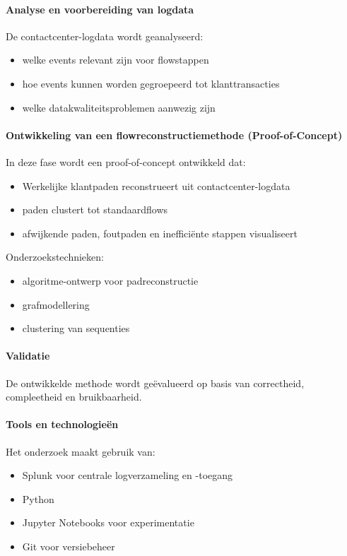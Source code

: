 \paragraph{Analyse en voorbereiding van logdata}
De contactcenter-logdata wordt geanalyseerd:
\begin{itemize}
  \item welke events relevant zijn voor flowstappen
  \item hoe events kunnen worden gegroepeerd tot klanttransacties
  \item welke datakwaliteitsproblemen aanwezig zijn
\end{itemize}




\paragraph{Ontwikkeling van een flowreconstructiemethode (Proof-of-Concept)}
In deze fase wordt een proof-of-concept ontwikkeld dat:
\begin{itemize}
  \item Werkelijke klantpaden reconstrueert uit contactcenter-logdata
  \item paden clustert tot standaardflows
  \item afwijkende paden, foutpaden en inefficiënte stappen visualiseert
\end{itemize}
Onderzoekstechnieken:
\begin{itemize}
  \item algoritme-ontwerp voor padreconstructie
  \item grafmodellering
  \item clustering van sequenties
\end{itemize}

\paragraph{Validatie}
De ontwikkelde methode wordt geëvalueerd op basis van correctheid, compleetheid en bruikbaarheid.

\paragraph{Tools en technologieën}
Het onderzoek maakt gebruik van:
\begin{itemize}
  \item Splunk voor centrale logverzameling en -toegang
  \item Python
  \item Jupyter Notebooks voor experimentatie
  \item Git voor versiebeheer
\end{itemize}

